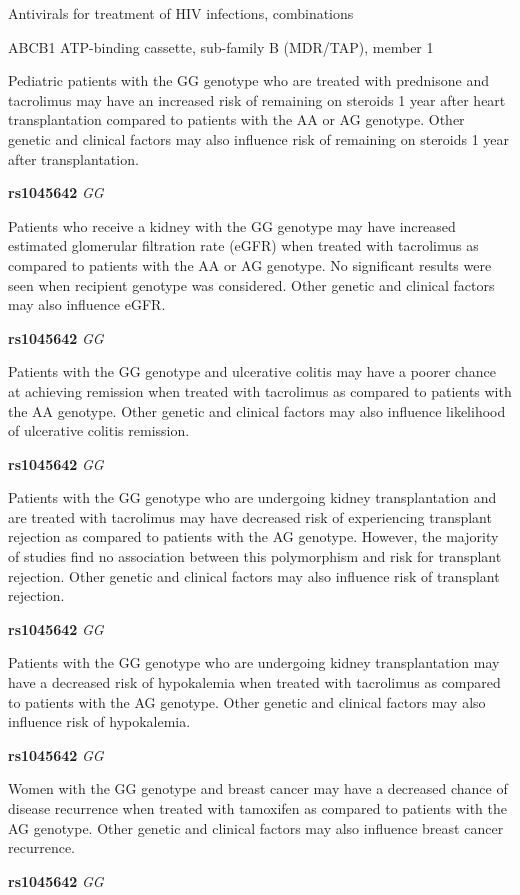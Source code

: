 \documentclass{resume} %
\begin{document}
\begin{rSection}{ Antivirals for treatment of HIV infections, combinations }
\begin{rSubsection}{ ABCB1 }{ ATP-binding cassette, sub-family B (MDR/TAP), member 1 }{}{}
\item[] Pediatric patients with the GG genotype who are treated with prednisone and tacrolimus may have an increased risk of remaining on steroids 1 year after heart transplantation compared to patients with the AA or AG genotype. Other genetic and clinical factors may also influence risk of remaining on steroids 1 year after transplantation.\item \textbf{ rs1045642 } \textit{ GG }
\item[] Patients who receive a kidney with the GG genotype may have increased estimated glomerular filtration rate (eGFR) when treated with tacrolimus as compared to patients with the AA or AG genotype. No significant results were seen when recipient genotype was considered. Other genetic and clinical factors may also influence eGFR. \item \textbf{ rs1045642 } \textit{ GG }
\item[] Patients with the GG genotype and ulcerative colitis may have a poorer chance at achieving remission when treated with tacrolimus as compared to patients with the AA genotype. Other genetic and clinical factors may also influence likelihood of ulcerative colitis remission.\item \textbf{ rs1045642 } \textit{ GG }
\item[] Patients with the GG genotype who are undergoing kidney transplantation and are treated with tacrolimus may have decreased risk of experiencing transplant rejection as compared to patients with the AG genotype. However, the majority of studies find no association between this polymorphism and risk for transplant rejection. Other genetic and clinical factors may also influence risk of transplant rejection.\item \textbf{ rs1045642 } \textit{ GG }
\item[] Patients with the GG genotype who are undergoing kidney transplantation may have a decreased risk of hypokalemia when treated with tacrolimus as compared to patients with the AG genotype. Other genetic and clinical factors may also influence risk of hypokalemia.\item \textbf{ rs1045642 } \textit{ GG }
\item[] Women with the GG genotype and breast cancer may have a decreased chance of disease recurrence when treated with tamoxifen as compared to patients with the AG genotype. Other genetic and clinical factors may also influence breast cancer recurrence.\item \textbf{ rs1045642 } \textit{ GG }

\end{rSubsection}
\end{rSection}
\end{document}
